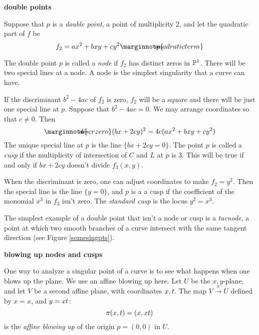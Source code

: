 \documentclass[leqno]{book}
\newcommand\Marginnote[1]{\marginnote{\hspace{-12pt}\normalfont{#1}}}
\renewcommand\theequation{\thesection.\arabic{equation}}
\newenvironment{boldequation}{\renewcommand\theequation{\textbf{\thesection.\arabic{equation}}}\equation}
   {\endequation}
\theoremstyle{definition}%
\numberwithin{equation}{section}
\theoremstyle{theorem} %
\begin{document}
\begin{boldequation}\Marginnote{dpt} 
\hspace{-10.5cm} \textbf{double points}
\label{dpt}\end{boldequation}

\ms
Suppose that $p$ is a {\it double point}, a point of multiplicity $2$,
and let the quadratic part of $f$ be
\begin{equation}
 f_2= ax^2+bxy+cy^2\Marginnote{quadraticterm}
 \label{quadraticterm}
\end{equation} 


\no The double point $p$ is called a {\it node} if
$f_2$ has distinct zeros in $\mathbb{P}^1$.  There will be two special lines
at a node.  A node is the simplest singularity that a curve can have.

\ms If the discriminant $b^2-4ac$ of $f_2$ is zero, $f_2$ will be a
square and there will be just one special line at $p$.  Suppose that
$b^2-4ac =0$.  We may arrange coordinates so that $c\neq 0$.  Then
\begin{equation}\label{discrzero}\Marginnote{discrzero}
(bx+2cy)^2 = 4c(ax^2+bxy+cy^2)
\end{equation}
The unique special line at $p$ is the line $\{bx+2cy=0\}$.  The
point $p$ is called a {\it cusp} if the multiplicity of intersection
of $C$ and $L$ at $p$ is $3$. This will be true if and only if
$bx+2cy$ doesn't divide $f_3(x,y)$.

When the discriminant is zero, one can adjust coordinates to make $f_2
= y^2$.  Then the special line is the line $\{y=0\}$, and $p$ is a a
{cusp} if the coefficient of the monomial $x^3$ in $f_3$ isn't zero.
The {\it standard cusp} is the locus $y^2=x^3$.


\ms
The simplest example of a double point that isn't a node or cusp is
a {\it tacnode}, a point at which two smooth branches of a curve intersect
with the same tangent direction (see Figure \ref{somesingpts}).


\begin{boldequation}
\Marginnote{blowupnodecusp} \hspace{-8.5cm} 
\textbf{blowing up nodes and cusps}
	\label{blowupnodecusp}
\end{boldequation}

\ms One way to analyze a singular point of a curve is to see
what happens when one blows up the plane.  We use an affine
blowing up here.  Let $U$ be the $x,y$-plane, and let $V$ be a second
affine plane, with coordinates $x,t$.  The map $V
\stackrel{\pi}{\longrightarrow} U$ defined by $x=x$, and
$y=xt$: $$\pi(x,t) = (x,xt)$$ is the {\it affine blowing up} of the
origin $p=(0,0)$ in $U$.
\end{document}
